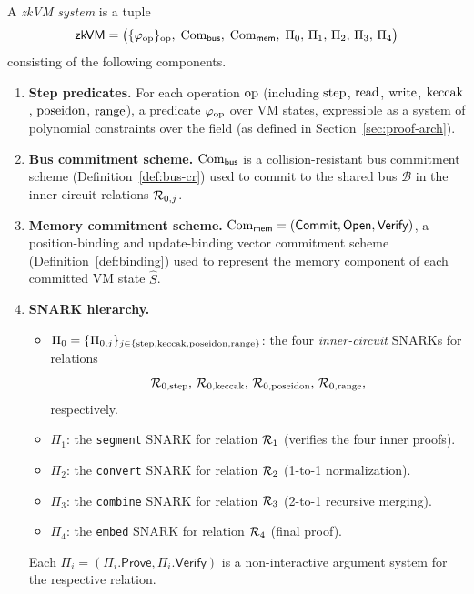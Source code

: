 \begin{definition}\label{def:zkvm}
A \emph{zkVM system} is a tuple
\[
  \mathsf{zkVM} = \bigl(
    \{\varphi_{\mathrm{op}}\}_{\mathrm{op}},\;
    \mathrm{Com}_{\mathsf{bus}},\;
    \mathrm{Com}_{\mathsf{mem}},\;
    \Pi_0,\, \Pi_1,\, \Pi_2,\, \Pi_3,\, \Pi_4
  \bigr)
\]
consisting of the following components.
\begin{enumerate}
  \item \textbf{Step predicates.}  For each operation $\mathrm{op}$ (including
    $\mathrm{step}$, $\mathrm{read}$, $\mathrm{write}$, $\mathrm{keccak}$, $\mathrm{poseidon}$, $\mathrm{range}$), a
    predicate $\varphi_{\mathrm{op}}$ over VM states, expressible as a system of
    polynomial constraints over the field (as defined in
    Section~\ref{sec:proof-arch}).

  \item \textbf{Bus commitment scheme.}
    $\mathrm{Com}_{\mathsf{bus}}$ is a collision-resistant
    bus commitment scheme (Definition~\ref{def:bus-cr}) used to commit to the shared bus
    $\mathcal{B}$ in the inner-circuit relations $\mathcal{R}_{0,j}$.

  \item \textbf{Memory commitment scheme.}
    $\mathrm{Com}_{\mathsf{mem}} = (\mathsf{Commit}, \mathsf{Open}, \mathsf{Verify})$,
    a position-binding and update-binding vector commitment scheme
    (Definition~\ref{def:binding}) used to represent the memory component
    of each committed VM state $\hat{S}$.

  \item \textbf{SNARK hierarchy.}
    \begin{itemize}
      \item $\Pi_0 = \{\Pi_{0,j}\}_{j \in \{\mathrm{step},\mathrm{keccak},\mathrm{poseidon},\mathrm{range}\}}$:
        the four \emph{inner-circuit} SNARKs for relations
        $$\mathcal{R}_{0,\mathrm{step}},\, \mathcal{R}_{0,\mathrm{keccak}},\,
         \mathcal{R}_{0,\mathrm{poseidon}},\, \mathcal{R}_{0,\mathrm{range}},$$ respectively.
      \item $\Pi_1$: the \texttt{segment} SNARK for relation $\mathcal{R}_1$
        (verifies the four inner proofs).
      \item $\Pi_2$: the \texttt{convert} SNARK for relation $\mathcal{R}_2$
        (1-to-1 normalization).
      \item $\Pi_3$: the \texttt{combine} SNARK for relation $\mathcal{R}_3$
        (2-to-1 recursive merging).
      \item $\Pi_4$: the \texttt{embed} SNARK for relation $\mathcal{R}_4$
        (final proof).
    \end{itemize}
    Each $\Pi_i = (\Pi_i.\mathsf{Prove}, \Pi_i.\mathsf{Verify})$ is a
    non-interactive argument system for the respective relation.
\end{enumerate}
\end{definition}


